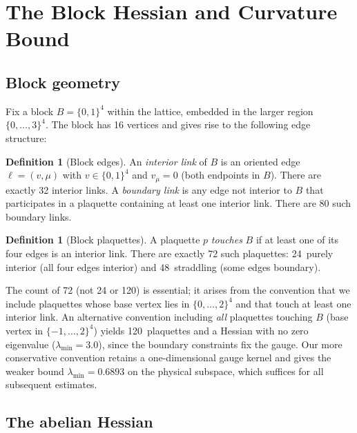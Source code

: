\documentclass[11pt]{article}
\theoremstyle{definition}
\newtheorem{definition}[theorem]{Definition}
\begin{document}
\section{The Block Hessian and Curvature Bound}\label{sec:block}

\subsection{Block geometry}\label{subsec:blockgeom}

Fix a block $B=\{0,1\}^4$ within the lattice, embedded in the larger
region $\{0,\ldots,3\}^4$.  The block has 16 vertices and gives rise
to the following edge structure:

\begin{definition}[Block edges]\label{def:edges}
An \emph{interior link} of $B$ is an oriented edge
$\ell=(v,\mu)$ with $v\in\{0,1\}^4$ and $v_\mu=0$ (both endpoints
in $B$).  There are exactly 32 interior links.  A \emph{boundary link}
is any edge not interior to $B$ that participates in a plaquette
containing at least one interior link.  There are 80 such boundary
links.
\end{definition}

\begin{definition}[Block plaquettes]\label{def:plaq}
A plaquette $p$ \emph{touches} $B$ if at least one of its four edges
is an interior link.  There are exactly 72 such plaquettes:
24~purely interior (all four edges interior) and 48~straddling (some
edges boundary).
\end{definition}

The count of 72 (not 24 or 120) is essential; it arises from the
convention that we include plaquettes whose base vertex lies in
$\{0,\ldots,2\}^4$ and that touch at least one interior link.  An
alternative convention including \emph{all} plaquettes touching $B$
(base vertex in $\{-1,\ldots,2\}^4$) yields 120~plaquettes and a
Hessian with no zero eigenvalue ($\lambda_{\min}=3.0$), since the
boundary constraints fix the gauge.  Our more conservative convention
retains a one-dimensional gauge kernel and gives the weaker bound
$\lambda_{\min}=0.6893$ on the physical subspace, which suffices for
all subsequent estimates.

\subsection{The abelian Hessian}\label{subsec:hessian}
\end{document}
